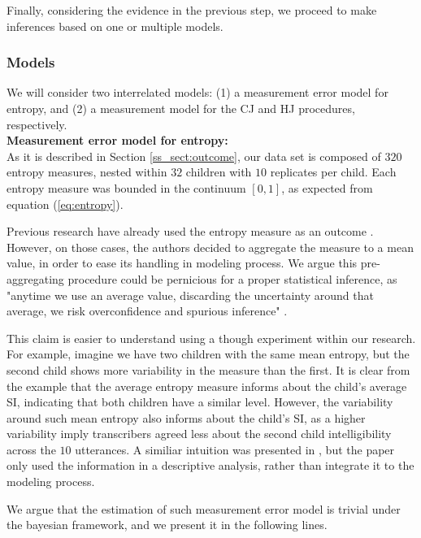 Finally, considering the evidence in the previous step, we proceed to make inferences based on one or multiple models.
%
%
\subsubsection{Models}
%
We will consider two interrelated models: (1) a measurement error model for entropy, and (2) a measurement model for the CJ and HJ procedures, respectively. \\

\noindent \textbf{Measurement error model for entropy:} \\
%
As it is described in Section \ref{ss_sect:outcome}, our data set is composed of $320$ entropy measures, nested within $32$ children with $10$ replicates per child. Each entropy measure was bounded in the continuum $[0,1]$, as expected from equation (\ref{eq:entropy}).

Previous research have already used the entropy measure as an outcome \citep{Boonen_et_al_2021, Faes_et_al_2021}. However, on those cases, the authors decided to aggregate the measure to a mean value, in order to ease its handling in modeling process. We argue this pre-aggregating procedure could be pernicious for a proper statistical inference, as "anytime we use an average value, discarding the uncertainty around that average, we risk overconfidence and spurious inference" \citep{McElreath_2020}. 

This claim is easier to understand using a though experiment within our research. For example, imagine we have two children with the same mean entropy, but the second child shows more variability in the measure than the first. It is clear from the example that the average entropy measure informs about the child's average SI, indicating that both children have a similar level. However, the variability around such mean entropy also informs about the child's SI, as a higher variability imply transcribers agreed less about the second child intelligibility across the $10$ utterances. A similiar intuition was presented in \citet{Boonen_et_al_2021}, but the paper only used the information in a descriptive analysis, rather than integrate it to the modeling process. 

We argue that the estimation of such measurement error model is trivial under the bayesian framework, and we present it in the following lines.

